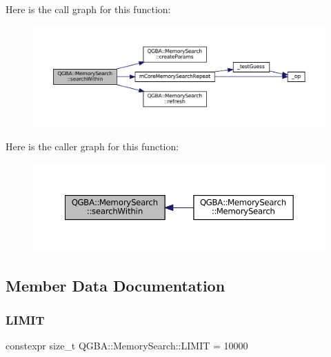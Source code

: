 Here is the call graph for this function\+:
\nopagebreak
\begin{figure}[H]
\begin{center}
\leavevmode
\includegraphics[width=350pt]{class_q_g_b_a_1_1_memory_search_a0a52eb65f64f02317f934b410135a614_cgraph}
\end{center}
\end{figure}
Here is the caller graph for this function\+:
\nopagebreak
\begin{figure}[H]
\begin{center}
\leavevmode
\includegraphics[width=350pt]{class_q_g_b_a_1_1_memory_search_a0a52eb65f64f02317f934b410135a614_icgraph}
\end{center}
\end{figure}


\subsection{Member Data Documentation}
\mbox{\label{class_q_g_b_a_1_1_memory_search_acd6fc184cead4d1c26ecc909a4d838fc}} 
\subsubsection{\texorpdfstring{L\+I\+M\+IT}{LIMIT}}
{\footnotesize\ttfamily constexpr size\+\_\+t Q\+G\+B\+A\+::\+Memory\+Search\+::\+L\+I\+M\+IT = 10000\hspace{0.3cm}{\ttfamily [static]}}

